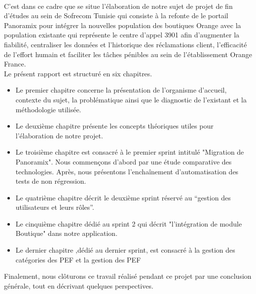 \\\newline
C’est dans ce cadre que se situe l’élaboration de notre sujet de projet de fin d’études au sein de Sofrecom Tunisie qui consiste à la refonte de le portail Panoramix pour intégrer la nouvelles population des boutiques Orange avec la population existante qui représente le centre d’appel 3901 afin d’augmenter la fiabilité, centraliser les données et l'historique des réclamations client, l’efficacité de l’effort humain et faciliter les tâches pénibles au sein de l’établissement Orange France.\\ \newline
Le présent rapport est structuré en six chapitres.
\begin{itemize}
	\item Le premier chapitre concerne la présentation de l'organisme d’accueil, contexte du sujet, la problématique ainsi que le diagnostic de l’existant et la méthodologie utilisée.
	\item Le deuxième chapitre présente les concepts théoriques utiles pour l’élaboration de notre projet.
	\item Le troisième chapitre est consacré à le premier sprint intitulé "Migration de Panoramix". Nous commençons d’abord par une étude comparative des technologies. Après, nous présentons l'enchaînement d’automatisation des tests de non régression.
	\item Le quatrième chapitre décrit le deuxième sprint réservé au “gestion des utilisateurs et leurs rôles”.
	\item Le  cinquième chapitre  dédié au sprint 2 qui décrit "l’intégration de module Boutique" dans notre application.
	\item Le dernier chapitre ,dédié au dernier sprint, est consacré à la gestion des catégories des PEF et la gestion des PEF
\end{itemize}
Finalement, nous clôturons ce travail réalisé pendant ce projet par une conclusion générale, tout en décrivant quelques perspectives.
